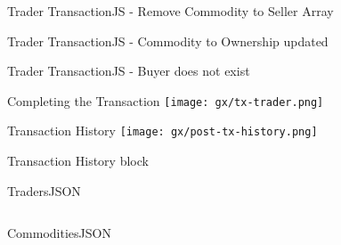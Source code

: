 \documentclass[pdf,table]{beamer}
\begin{document}
\begin{frame}{Trader Transaction}{JS - Remove Commodity to Seller Array}
	
\end{frame}

\begin{frame}{Trader Transaction}{JS - Commodity to Ownership updated}
	
\end{frame}

\begin{frame}{Trader Transaction}{JS - Buyer does not exist}
	
\end{frame}

\begin{frame}{Completing the Transaction}
	\texttt{[image: gx/tx-trader.png]}
\end{frame}

\begin{frame}{Transaction History}
	\texttt{[image: gx/post-tx-history.png]}
\end{frame}

\begin{frame}{Transaction History block}
	
\end{frame}

\begin{frame}{Traders}{JSON}
	\begin{columns}[T]
		\begin{column}{0.44\textwidth}
			
		\end{column}
		\begin{column}{0.44\textwidth}
			
		\end{column}
	\end{columns}	
\end{frame}

\begin{frame}{Commodities}{JSON}
	\begin{columns}[T]
		\begin{column}{0.44\textwidth}
			
		\end{column}
		\begin{column}{0.44\textwidth}
			
		\end{column}
	\end{columns}	
\end{frame}
\end{document}
